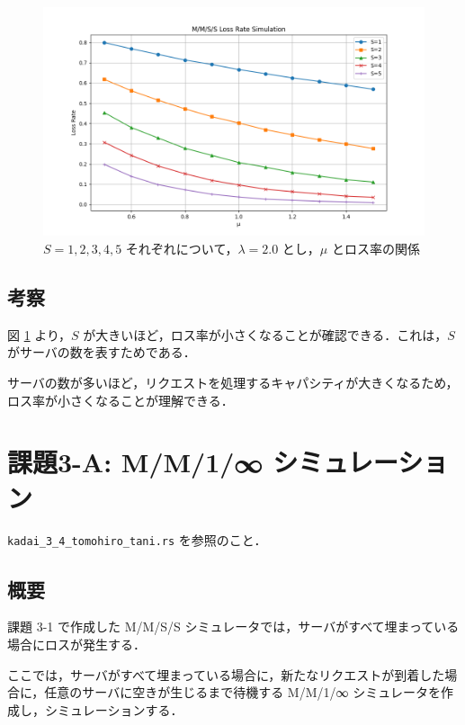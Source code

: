 \documentclass[fleqn, a4paper. 12pt]{jsarticle}
\begin{document}
        \begin{figure}[!h]
          \centering
          \includegraphics[width=1\textwidth]{plot_3_3.png}
          \caption{$S=1,2,3,4,5$ それぞれについて，$\lambda = 2.0$ とし，$\mu$ とロス率の関係}
          \label{fig:9}
        \end{figure}
  
      \subsection*{考察}
  
        図 \ref{fig:9} より，$S$ が大きいほど，ロス率が小さくなることが確認できる．これは，$S$ がサーバの数を表すためである．

        サーバの数が多いほど，リクエストを処理するキャパシティが大きくなるため，ロス率が小さくなることが理解できる．

    \newpage

    \section*{課題3-A: M/M/1/∞ シミュレーション}
  
      \texttt{kadai\_3\_4\_tomohiro\_tani.rs} を参照のこと．
  
      \subsection*{概要}
  
        課題 3-1 で作成した M/M/S/S シミュレータでは，サーバがすべて埋まっている場合にロスが発生する．
  
        ここでは，サーバがすべて埋まっている場合に，新たなリクエストが到着した場合に，任意のサーバに空きが生じるまで待機する M/M/1/∞ シミュレータを作成し，シミュレーションする．
  
\end{document}
